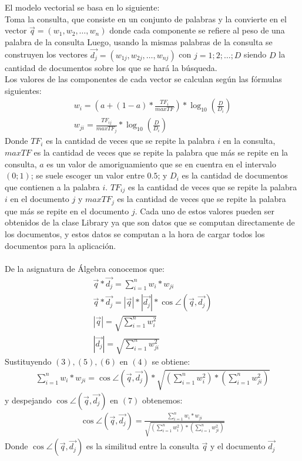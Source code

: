 \documentclass[a4paper,12pt]{article}
\begin{document}
El modelo vectorial se basa en lo siguiente:\\
Toma la consulta, que consiste en un conjunto de palabras y la convierte en el vector $\vec{q} = ( w_1 , w_2 , \dots , w_n )$ donde cada componente se refiere al peso de una palabra de la consulta
Luego, usando la mismas palabras de la consulta se construyen los vectores $\vec{d_j} = ( w_{1j} , w_{2j} , \dots , w_{nj})$ con $j = 1;2; \dots ; D$ siendo $D$ la cantidad de documentos sobre los que se har\'a la b\'usqueda.\\
Los valores de las componentes de cada vector se calculan seg\'un las f\'ormulas siguientes:\\
\begin{eqnarray}
    w_i = (a + (1- a)*\frac{TF_i}{max TF})*\log_{10}(\frac{D}{D_i})\\
    w_{ji} = \frac{TF_{ij}}{max TF_j} * \log_{10}(\frac{D}{D_i})
\end{eqnarray}
Donde $TF_i$ es la cantidad de veces que se repite la palabra $i$ en la consulta, $maxTF$ es la cantidad de veces que se repite la palabra que m\'as se repite en la consulta, $a$ es 
un valor de amoriguamiento que se en cuentra en el intervalo $(0;1)$; se suele escoger un valor entre $0.5$; y $D_i$ es la cantidad de documentos que contienen a la palabra $i$. $TF_{ij}$
es la cantidad de veces que se repite la palabra $i$ en el documento $j$ y $maxTF_j$ es la cantidad de veces que se repite la palabra que m\'as se repite en el documento $j$. Cada uno de 
estos valores pueden ser obtenidos de la clase Library ya que son datos que se computan directamente de los documentos, y estos datos se computan a la hora de cargar todos los documentos
para la aplicaci\'on.\\
\\
De la asignatura de \'Algebra conocemos que:
\begin{eqnarray}
    \vec{q}*\vec{d_j} = \sum_{i = 1}^{n} w_i*w_{ji}\\
    \vec{q}*\vec{d_j} = |\vec{q}|*|\vec{d_j}|*\cos\angle(\vec{q},\vec{d_j})\\
    |\vec{q}| = \sqrt{\sum_{i = 1}^n w_i^2}\\
    |\vec{d_j}| = \sqrt{\sum_{i = 1}^n w_{ji}^2}
\end{eqnarray}
Sustituyendo $(3),(5),(6)$ en $(4)$ se obtiene:
\begin{eqnarray}
    \sum_{i = 1}^n w_i*w_{ji} = \cos\angle(\vec{q},\vec{d_j}) *\sqrt{(\sum_{i = 1}^n w_i^2 )* (\sum_{i = 1}^n w_{ji}^2)} 
\end{eqnarray}
y despejando $\cos\angle(\vec{q},\vec{d_j})$ en $(7)$ obtenemos:
\begin{eqnarray}
    \cos \angle(\vec{q},\vec{d_j}) = \frac{\sum_{i = 1}^n w_i*w_{ji}}{\sqrt{(\sum_{i = 1}^n w_i^2 )* (\sum_{i = 1}^n w_{ji}^2)}}
\end{eqnarray}
Donde $\cos \angle(\vec{q},\vec{d_j})$ es la similitud entre la consulta $\vec{q}$ y el documento $\vec{d_j}$
\end{document}
